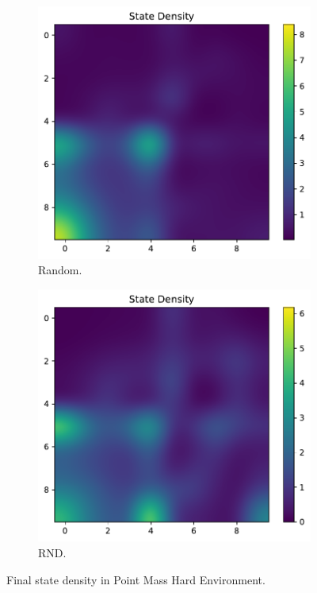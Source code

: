 \documentclass{article}
\begin{document}
\begin{answer}[title=Plot,height=9.5cm,width=\linewidth]
    \begin{figure}[H]
        \centering
        \begin{subfigure}[b]{.45\linewidth}
            \centering
            \includegraphics[width=.99\linewidth]{figs/P6_hard_random_density.pdf}
            \caption{Random.}
        \end{subfigure}
        \begin{subfigure}[b]{.45\linewidth}
            \centering
            \includegraphics[width=.99\linewidth]{figs/P6_hard_rnd_density.pdf}
            \caption{RND.}
        \end{subfigure}
        \caption{Final state density in Point Mass Hard Environment.}
    \end{figure}
\end{answer}
\end{document}
